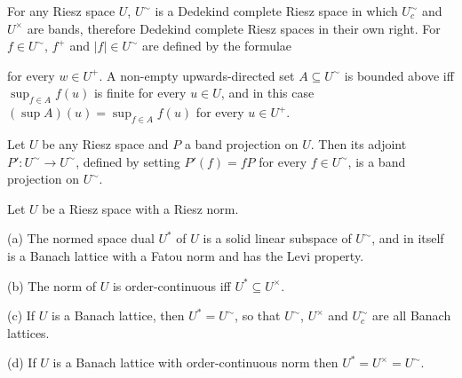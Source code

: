  For any Riesz space $U$, $U^{\sim}$ is a Dedekind
complete Riesz space in which $U^{\sim}_c$ and $U^{\times}$ are bands,
therefore Dedekind complete Riesz spaces in their own right.   For
$f\in U^{\sim}$, $f^+$ and $|f|\in U^{\sim}$ are defined by the formulae


\noindent for every $w\in U^+$.   A non-empty upwards-directed set
$A\subseteq U^{\sim}$ is bounded above iff $\sup_{f\in A}f(u)$ is finite
for every $u\in U$, and in this case $(\sup A)(u)=\sup_{f\in A}f(u)$ for
every $u\in U^+$.


 Let $U$ be any Riesz space and $P$ a band
projection on $U$.   Then its adjoint $P':U^{\sim}\to U^{\sim}$, defined
by setting $P'(f)=fP$ for every $f\in U^{\sim}$, is a band projection on
$U^{\sim}$.


 Let $U$ be a Riesz space with a Riesz norm.

(a) The normed space dual $U^*$ of $U$ is a solid linear subspace of
$U^{\sim}$, and in itself is a Banach lattice with a Fatou norm and has
the Levi property.

(b) The norm of $U$ is order-continuous iff $U^*\subseteq U^{\times}$.

(c) If $U$ is a Banach lattice, then $U^*=U^{\sim}$, so that $U^{\sim}$,
$U^{\times}$ and $U^{\sim}_c$ are all Banach lattices.

(d) If $U$ is a Banach lattice with order-continuous norm then
$U^*=U^{\times}=U^{\sim}$.

